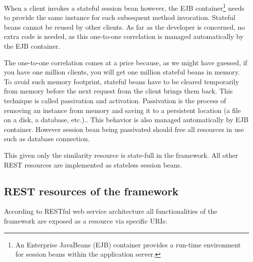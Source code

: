 \documentclass[thesis=M,english]{FITthesis}[2012/10/20]
\begin{document}
When a client invokes a stateful session bean however, the EJB container\footnote{An Enterprise JavaBeans (EJB) container provides a run-time environment for session beans within the application server.} needs to provide the same instance for each subsequent method invocation. Stateful beans cannot be reused by other clients. As far as the developer is concerned, no extra code is needed, as this one-to-one correlation is managed automatically by the EJB container.

The one-to-one correlation comes at a price because, as we might have guessed, if you have one million clients, you will get one million stateful beans in memory. To avoid such memory footprint, stateful beans have to be cleared temporarily from memory before the next request from the client brings them back. This technique is called passivation and activation. Passivation is the process of removing an instance from memory and saving it to a persistent location (a file on a disk, a database, etc.).\cite{java}. This behavior is also managed automatically by EJB container. However session bean being passivated should free all resources in use such as database connection.

This given only the similarity resource is state-full in the framework. All other REST resources are implemented as stateless session beans. 

\subsection{REST resources of the framework}
\label{restRef}
According to RESTful web service architecture all functionalities of the framework are exposed as a resource via specific URIs:
\end{document}
